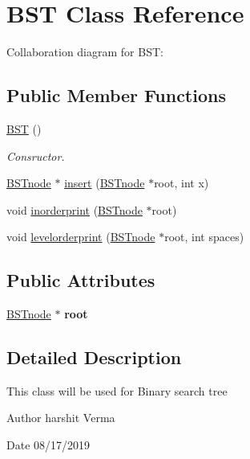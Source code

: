 \hypertarget{classBST}{}\section{B\+ST Class Reference}
\label{classBST}


Collaboration diagram for B\+ST\+:
\subsection*{Public Member Functions}
\begin{DoxyCompactItemize}
\item 
\mbox{\label{classBST_abc17123a0367c3b8ad0382eeb3ad3178}} 
\hyperlink{classBST_abc17123a0367c3b8ad0382eeb3ad3178}{B\+ST} ()
\begin{DoxyCompactList}\small\item\em Consructor. \end{DoxyCompactList}\item 
\hyperlink{classBSTnode}{B\+S\+Tnode} $\ast$ \hyperlink{classBST_af65e88788cd21ab5e64e645cbe541c8c}{insert} (\hyperlink{classBSTnode}{B\+S\+Tnode} $\ast$root, int x)
\item 
void \hyperlink{classBST_ada5620d8d4fd050273055ecea1d6f03b}{inorderprint} (\hyperlink{classBSTnode}{B\+S\+Tnode} $\ast$root)
\item 
void \hyperlink{classBST_a416d136d85763c420f35f5f3dcdb72db}{levelorderprint} (\hyperlink{classBSTnode}{B\+S\+Tnode} $\ast$root, int spaces)
\end{DoxyCompactItemize}
\subsection*{Public Attributes}
\begin{DoxyCompactItemize}
\item 
\mbox{\label{classBST_ad6a0adce52bff0415be37ce02070cfdc}} 
\hyperlink{classBSTnode}{B\+S\+Tnode} $\ast$ {\bfseries root}
\end{DoxyCompactItemize}


\subsection{Detailed Description}
This class will be used for Binary search tree \begin{DoxyAuthor}{Author}
harshit Verma 
\end{DoxyAuthor}
\begin{DoxyDate}{Date}
08/17/2019 
\end{DoxyDate}


